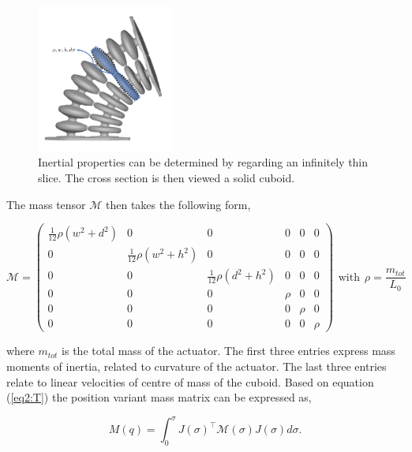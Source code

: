 \clearpage

\begin{figure}[H]
    \centering
    \includegraphics[width = 0.4\textwidth]{Figures/Chapter2/massapprox.png}
    \caption{Inertial properties can be determined by regarding an infinitely thin slice. The cross section is then viewed a solid cuboid.}
    \label{fig:massapprox}
\end{figure}

The mass tensor $\mathcal{M}$ then takes the following form,

\begin{equation}
    \mathcal{M} = \begin{pmatrix} \frac{1}{12}\rho (w^2 + d^2) & 0 & 0 & 0 & 0 & 0 \\
                                  0 & \frac{1}{12}\rho (w^2 + h^2) & 0 & 0 & 0 & 0 \\
                                  0 & 0 & \frac{1}{12}\rho (d^2 + h^2) & 0 & 0 & 0 \\
                                  0 & 0 & 0 & \rho & 0 & 0 \\
                                  0 & 0 & 0 & 0 & \rho & 0 \\
                                  0 & 0 & 0 & 0 & 0 & \rho \end{pmatrix}\hspace{5pt} \text{with} \hspace{5pt} \rho = \frac{m_{tot}}{L_0}
\end{equation} 




where $m_{tot}$ is the total mass of the actuator. The first three entries express mass moments of inertia, related to curvature of the actuator. The last three entries relate to linear velocities of centre of mass of the cuboid. Based on equation (\ref{eq2:T}) the position variant mass matrix can be expressed as, 


\begin{equation}
    M(q) = \int_0^{\sigma} J(\sigma)^\top \mathcal{M}(\sigma)J(\sigma) d \sigma.
\end{equation}

